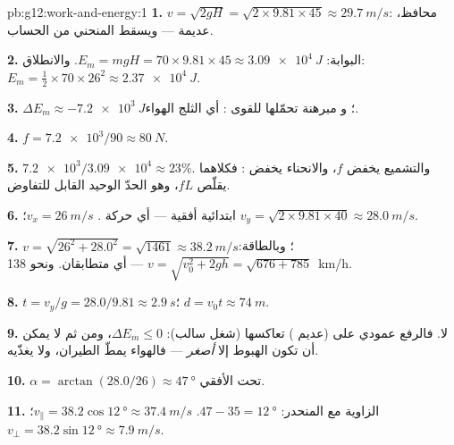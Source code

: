 \begin{solution}{pb:g12:work-and-energy:1}
\textbf{1.} $v = \sqrt{2gH} = \sqrt{2 \times 9.81 \times 45} \approx
\qty{29.7}{m/s}$:  محافظ،  عديمة  --- ويسقط
المنحني من الحساب.

\textbf{2.} البوابة: $E_m = mgH = 70 \times 9.81 \times 45 \approx
\qty{3.09e4}{J}$. والانطلاق: $E_m = \tfrac12 \times 70 \times 26^2
\approx \qty{2.37e4}{J}$.

\textbf{3.} $\Delta E_m \approx \qty{-7.2e3}{J}$؛ و
مبرهنة  تحمّلها للقوى :
أي  الثلج  الهواء.

\textbf{4.} $f = \num{7.2e3}/90 \approx \qty{80}{N}$.

\textbf{5.} $\num{7.2e3}/\num{3.09e4} \approx 23\%$. والتشميع يخفض $f$،
والانحناء يخفض : فكلاهما يقلّص $fL$، وهو الحدّ الوحيد القابل للتفاوض.

\textbf{6.}   ابتدائية أفقية --- أي حركة
. $v_x = \qty{26}{m/s}$؛
$v_y = \sqrt{2 \times 9.81 \times 40} \approx \qty{28.0}{m/s}$.

\textbf{7.} $v = \sqrt{26^2 + 28.0^2} = \sqrt{1461} \approx
\qty{38.2}{m/s}$؛ وبالطاقة: $v = \sqrt{v_0^2 + 2gh} = \sqrt{676 + 785}$
--- أي متطابقان. ونحو \qty{138}{km/h}.

\textbf{8.} $t = v_y/g = 28.0/9.81 \approx \qty{2.9}{s}$؛
$d = v_0 t \approx \qty{74}{m}$.

\textbf{9.} لا. فالرفع عمودي على  (عديم )
 تعاكسها (شغل سالب): $\Delta E_m \leq 0$، ومن ثم لا يمكن أن تكون 
الهبوط  إلا \emph{أصغر} --- فالهواء يمطّ
الطيران، ولا يغذّيه.

\textbf{10.} $\alpha = \arctan(28.0/26) \approx \qty{47}{\degree}$
تحت الأفقي.

\textbf{11.} الزاوية مع المنحدر: $47 - 35 = \qty{12}{\degree}$.
$v_\parallel = 38.2\cos\qty{12}{\degree} \approx \qty{37.4}{m/s}$؛
$v_\perp = 38.2\sin\qty{12}{\degree} \approx \qty{7.9}{m/s}$.


\end{solution}
